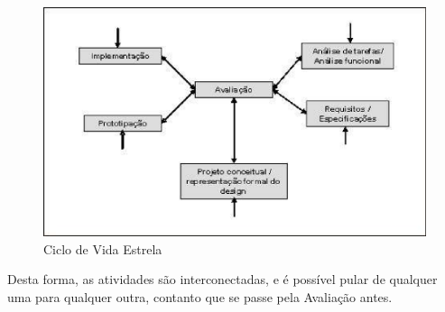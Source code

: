 \begin{figure}[h!]
	\begin{center}
		\includegraphics[keepaspectratio,scale=1.0]{figuras/ciclo_de_vida_estrela.eps}
		\caption{Ciclo de Vida Estrela}
	\end{center}
\end{figure}

Desta forma, as atividades são interconectadas, e é possível pular de qualquer uma para qualquer outra, contanto que se passe pela Avaliação antes. 